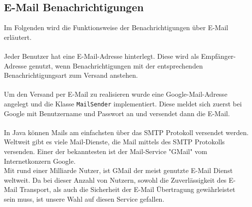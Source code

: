 \subsection{E-Mail Benachrichtigungen}

Im Folgenden wird die Funktionsweise der Benachrichtigungen über E-Mail erläutert.
\\\\
Jeder Benutzer hat eine E-Mail-Adresse hinterlegt. Diese wird als Empfänger-Adresse genutzt, wenn Benachrichtigungen mit der entsprechenden Benachrichtigungsart zum Versand anstehen.
\\\\
Um den Versand per E-Mail zu realisieren wurde eine Google-Mail-Adresse angelegt und die Klasse \texttt{MailSender} implementiert. Diese meldet sich zuerst bei Google mit Benutzername und Passwort an und versendet dann die E-Mail.
\\\\
In Java können Mails am einfachsten über das \acs{SMTP} Protokoll versendet werden. Weltweit gibt es viele Mail-Dienste, die Mail mittels des SMTP Protokolls versenden. Einer der bekanntesten ist der Mail-Service "GMail" vom Internetkonzern Google. 
\\
Mit rund einer Milliarde Nutzer, ist GMail der meist genutzte E-Mail Dienst weltweit. Da bei dieser Anzahl von Nutzern, sowohl die Zuverlässigkeit des E-Mail Transport, als auch die Sicherheit der E-Mail Übertragung gewährleistet sein muss, ist unsere Wahl auf diesen Service gefallen.